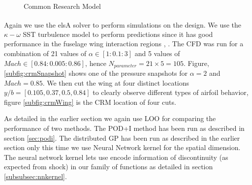 \begin{figure}[!ht]
  \centering
  \quad
  \caption{Common Research Model}
\end{figure}

Again we use the elsA\textsuperscript{\textregistered} solver to perform simulations on the design. We use the \(\kappa - \omega\) SST turbulence model to perform predictions since it has good performance in the fuselage wing interaction regions \cite{menter2003ten}, \cite{vassberg2014summary}. The CFD was run for a combination of 21 values of \(\alpha \in [1: 0.1: 3]\) and 5 values of \(Mach \in [0.84: 0.005: 0.86]\), hence \(N_{parameter} = 21\times5 = 105\). Figure, \ref{subfig:crmSnapshot} shows one of the pressure snapshots for \(\alpha = 2\) and \(Mach = 0.85\). We then cut the wing at four distinct locations \(y/b = [0.105, 0.37, 0.5, 0.84]\) to clearly observe different types of airfoil behavior, figure \ref{subfig:crmWing} is the CRM location of four cuts. 

As detailed in the earlier section we again use LOO for comparing the performance of two methods. The POD+I method has been run as described in section \ref{sec:podi}. The distributed GP has been run as described in the earlier section only this time we use Neural Network kernel for the spatial dimension. The neural network kernel lets use encode information of discontinuity (as expected from shock) in our family of functions as detailed in section \ref{subsubsec:nnkernel}. 

